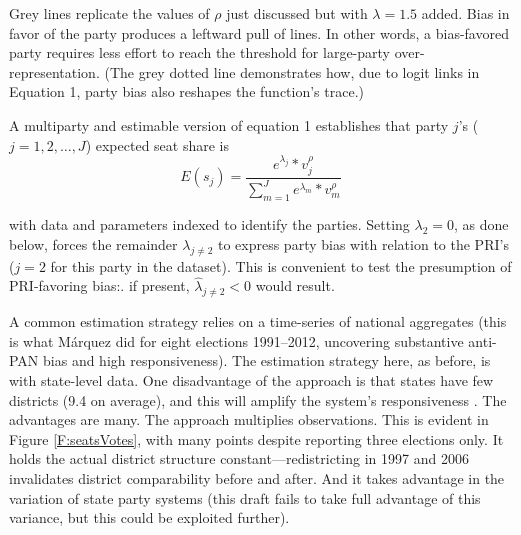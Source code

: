 \documentclass[letter,12pt]{article}
\begin{document}
Grey lines replicate the values of $\rho$ just discussed but with $\lambda = 1.5$ added. Bias in favor of the party produces a leftward pull of lines. In other words, a bias-favored party requires less effort to reach the threshold for large-party over-representation. (The grey dotted line demonstrates how, due to logit links in Equation 1, party bias also reshapes the function's trace.)

A multiparty and estimable version of equation 1 \citep{king.1990elRespBiasMultiparty} establishes that party $j$'s ($j=1,2,\ldots,J$) expected seat share is 
\begin{equation}
 E(s_j) = \frac{e^{\lambda_j} * v_j^\rho}{\sum_{m=1}^{J} e^{\lambda_m} * v_m^\rho}
\end{equation}

\noindent with data and parameters indexed to identify the parties. \citep[Another, with application to Argentine federalism, is][.]{calvo.micozzi.govReform.2005} Setting $\lambda_2 = 0$, as done below, forces the remainder $\lambda_{j \neq 2}$ to express party bias with relation to the PRI's ($j=2$ for this party in the dataset). This is convenient to test the presumption of PRI-favoring bias:. if present, $\hat{\lambda}_{j \neq 2}<0$ would result.

A common estimation strategy relies on a time-series of national aggregates (this is what M\'arquez did for eight elections 1991--2012, uncovering substantive anti-PAN bias and high responsiveness). The estimation strategy here, as before, is with state-level data. One disadvantage of the approach is that states have few districts (9.4 on average), and this will amplify the system's responsiveness \citep{taagepera.CubeLaw.1973}. The advantages are many. The approach multiplies observations. This is evident in Figure \ref{F:seatsVotes}, with many points despite reporting three elections only. It holds the actual district structure constant---redistricting in 1997 and 2006 invalidates district comparability before and after. And it takes advantage in the variation of state party systems (this draft fails to take full advantage of this variance, but this could be exploited further). 
\end{document}
